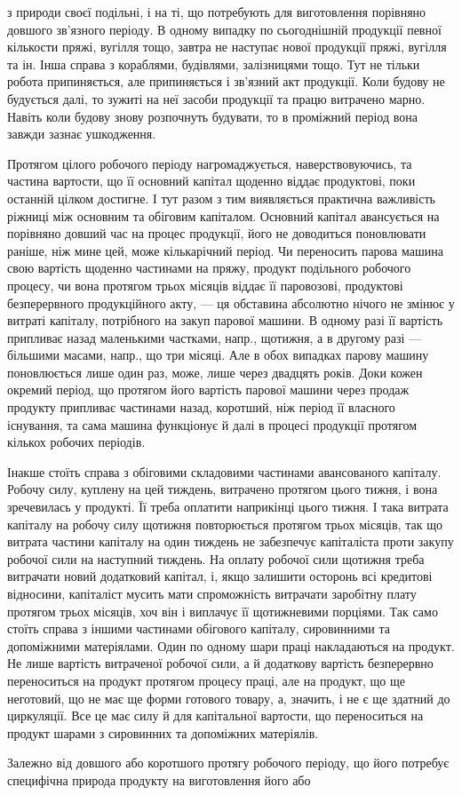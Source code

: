 \parcont{}  %
з природи своєї подільні, і на ті, що потребують для виготовлення порівняно
довшого зв’язного періоду. В одному випадку по сьогоднішній
продукції певної кількости пряжі, вугілля тощо, завтра не наступає нової
продукції пряжі, вугілля та ін. Інша справа з кораблями, будівлями, залізницями
тощо. Тут не тільки робота припиняється, але припиняється
і зв’язний акт продукції. Коли будову не будується далі, то зужиті на
неї засоби продукції та працю витрачено марно. Навіть коли будову знову
розпочнуть будувати, то в проміжний період вона завжди зазнає ушкодження.

Протягом цілого робочого періоду нагромаджується, наверствовуючись,
та частина вартости, що її основний капітал щоденно віддає продуктові,
поки останній цілком достигне. І тут разом з тим виявляється практична
важливість ріжниці між основним та обіговим капіталом. Основний капітал
авансується на порівняно довший час на процес продукції, його не
доводиться поновлювати раніше, ніж мине цей, може кількарічний період.
Чи переносить парова машина свою вартість щоденно частинами на пряжу,
продукт подільного робочого процесу, чи вона протягом трьох місяців
віддає її паровозові, продуктові безперервного продукційного акту, —
ця обставина абсолютно нічого не змінює у витраті капіталу, потрібного
на закуп парової машини. В одному разі її вартість припливає назад маленькими
частками, напр., щотижня, а в другому разі — більшими масами,
напр., що три місяці. Але в обох випадках парову машину поновлюється
лише один раз, може, лише через двадцять років. Доки кожен окремий
період, що протягом його вартість парової машини через продаж продукту
припливає частинами назад, коротший, ніж період її власного існування,
та сама машина функціонує й далі в процесі продукції протягом
кількох робочих періодів.

Інакше стоїть справа з обіговими складовими частинами авансованого
капіталу. Робочу силу, куплену на цей тиждень, витрачено протягом
цього тижня, і вона зречевилась у продукті. Її треба оплатити наприкінці
цього тижня. І така витрата капіталу на робочу силу щотижня повторюється
протягом трьох місяців, так що витрата частини капіталу на
один тиждень не забезпечує капіталіста проти закупу робочої сили на
наступний тиждень. На оплату робочої сили щотижня треба витрачати
новий додатковий капітал, і, якщо залишити осторонь всі кредитові відносини,
капіталіст мусить мати спроможність витрачати заробітну плату
протягом трьох місяців, хоч він і виплачує її щотижневими порціями. Так
само стоїть справа з іншими частинами обігового капіталу, сировинними
та допоміжними матеріялами. Один по одному шари праці накладаються на
продукт. Не лише вартість витраченої робочої сили, а й додаткову
вартість безперервно переноситься на продукт протягом процесу праці,
але на продукт, що ще неготовий, що не має ще форми готового товару,
а, значить, і не є ще здатний до циркуляції. Все це має силу й для капітальної
вартости, що переноситься на продукт шарами з сировинних та
допоміжних матеріялів.

Залежно від довшого або коротшого протягу робочого періоду, що
його потребує специфічна природа продукту на виготовлення його або
\parbreak{}  %

